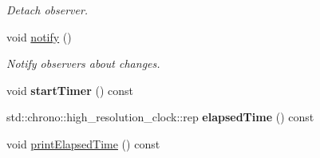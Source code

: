 \begin{DoxyCompactItemize}
\begin{DoxyCompactList}\small\item\em Detach observer. \end{DoxyCompactList}\item 
void \hyperlink{classSpacy_1_1Mixin_1_1MixinConnection_a1ddeaa78a3bb4a38c2cca36d1f99fe36}{notify} ()\hypertarget{classSpacy_1_1Mixin_1_1MixinConnection_a1ddeaa78a3bb4a38c2cca36d1f99fe36}{}\label{classSpacy_1_1Mixin_1_1MixinConnection_a1ddeaa78a3bb4a38c2cca36d1f99fe36}

\begin{DoxyCompactList}\small\item\em Notify observers about changes. \end{DoxyCompactList}\item 
void {\bfseries start\+Timer} () const\hypertarget{classSpacy_1_1Mixin_1_1Timer_acf3c292b6d482c7c4ded5f961be4bc4b}{}\label{classSpacy_1_1Mixin_1_1Timer_acf3c292b6d482c7c4ded5f961be4bc4b}

\item 
std\+::chrono\+::high\+\_\+resolution\+\_\+clock\+::rep {\bfseries elapsed\+Time} () const\hypertarget{classSpacy_1_1Mixin_1_1Timer_ab27a20d8e1e9bc90ea56cb18ff752798}{}\label{classSpacy_1_1Mixin_1_1Timer_ab27a20d8e1e9bc90ea56cb18ff752798}

\item 
void \hyperlink{classSpacy_1_1Mixin_1_1Timer_a3b79b35213702118d0823f6040d5a315}{print\+Elapsed\+Time} () const\hypertarget{classSpacy_1_1Mixin_1_1Timer_a3b79b35213702118d0823f6040d5a315}{}\label{classSpacy_1_1Mixin_1_1Timer_a3b79b35213702118d0823f6040d5a315}


\end{DoxyCompactItemize}
